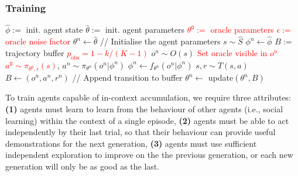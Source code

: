 \documentclass{article}
\begin{document}
\subsubsection{Training}
\begin{algorithm}
\caption{Training Loop for In-Context Accumulation (changes to RL$^2$ in \textcolor{red}{red})}\label{alg:rl2}
\begin{algorithmic}[1]
\STATE $\hat{\phi} :=$ init. agent state
\STATE $\hat{\theta} :=$ init. agent parameters
\STATE \textcolor{red}{$\theta^\texttt{O} :=$ oracle parameters}
\STATE \textcolor{red}{$\epsilon :=$ oracle noise factor}
\STATE $\theta^n \gets \hat{\theta}$ // Initialise the agent parameters
\STATE $s \sim \hat{S}$
\STATE $\phi^n \leftarrow \hat{\phi}$
\STATE $B :=$ trajectory buffer
\STATE \textcolor{red}{$p_{\text{obs}} = 1 - k/(K-1)$}
\STATE $o^n \sim O(s)$
\STATE \textcolor{red}{Set oracle visible in $o^n$}
\ENDIF
\STATE \textcolor{red}{$a^\texttt{O} \sim \pi_{\theta^\texttt{O}, \epsilon}(s)$}, $a^n \sim \pi_{\theta^n}(o^n | \phi^n)$
\STATE $\phi^n \gets f_{\theta^n}(o^n | \phi^n)$
\STATE $s, r \sim T(s, a)$
\STATE $B \leftarrow (o^n, a^n, r^n)$ // Append transition to buffer
\ENDWHILE
\ENDFOR
\STATE $\theta^n \leftarrow$ update$(\theta^n, B)$
\ENDFOR
\end{algorithmic}
\end{algorithm}
To train agents capable of in-context accumulation, we require three attributes: \textbf{(1)} agents must learn to learn from the behaviour of other agents (i.e., social learning) within the context of a single episode, \textbf{(2)} agents must be able to act independently by their last trial, so that their behaviour can provide useful demonstrations for the next generation, \textbf{(3)} agents must use sufficient independent exploration to improve on the the previous generation, or each new generation will only be as good as the last.
\end{document}

